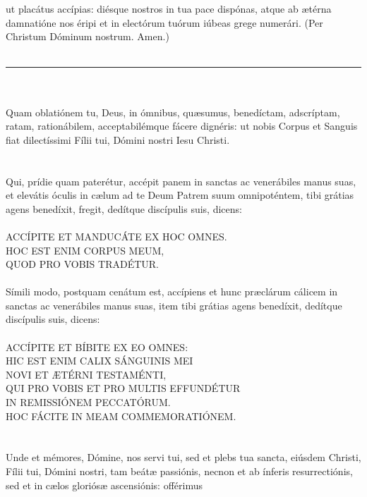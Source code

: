 \documentclass[12pt, a4paper]{article}
\begin{document}
	ut placátus accípias: diésque
	nostros in tua pace dispónas, atque
	ab ætérna damnatióne nos éripi et
	in electórum tuórum iúbeas grege numerári. (Per Christum Dóminum
	nostrum. Amen.)
	\\\\
	\noindent\rule{10cm}{0.4pt}
	\\\\
	Quam oblatiónem tu, Deus, in
	ómnibus, quæsumus, benedíctam,
	adscríptam, ratam, rationábilem,
	acceptabilémque fácere dignéris: ut
	nobis Corpus et Sanguis fiat
	dilectíssimi Fílii tui, Dómini nostri
	Iesu Christi.
	\\\\
	\\
	Qui, prídie quam paterétur, accépit
	panem in sanctas ac venerábiles
	manus suas, et elevátis óculis in
	cælum ad te Deum Patrem suum
	omnipoténtem, tibi grátias agens
	benedíxit, fregit, dedítque discípulis
	suis, dicens:
	\\\\
	ACCÍPITE ET MANDUCÁTE EX HOC
	OMNES.
	\\
	HOC EST ENIM CORPUS MEUM,
	\\
	QUOD PRO VOBIS TRADÉTUR.
	\\\\
	Símili modo, postquam cenátum
	est, accípiens et hunc præclárum
	cálicem in sanctas ac venerábiles
	manus suas, item tibi grátias agens
	benedíxit, dedítque discípulis suis,
	dicens:
	\\\\
	ACCÍPITE ET BÍBITE EX EO OMNES:
	\\
	HIC EST ENIM CALIX SÁNGUINIS MEI
	\\
	NOVI ET ÆTÉRNI TESTAMÉNTI,
	\\
	QUI PRO VOBIS ET PRO MULTIS EFFUNDÉTUR
	\\
	IN REMISSIÓNEM PECCATÓRUM.
	\\
	HOC FÁCITE IN MEAM COMMEMORATIÓNEM.
	\\\\
	\\
	Unde et mémores, Dómine,
	nos servi tui, sed et plebs tua
	sancta, eiúsdem Christi, Fílii tui,
	Dómini nostri, tam beátæ
	passiónis, necnon et ab ínferis
	resurrectiónis, sed et in cælos
	gloriósæ ascensiónis: offérimus
\end{document}
